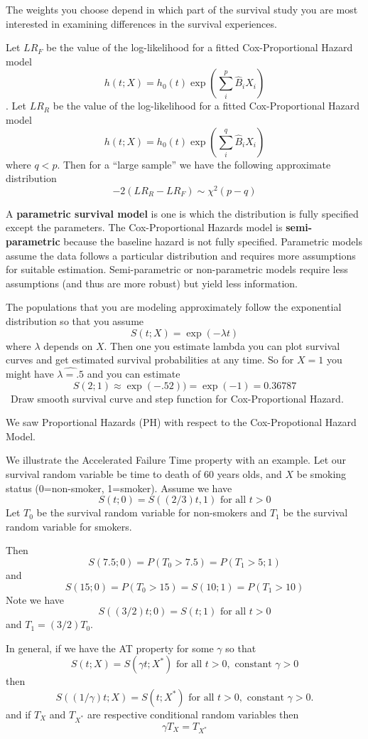 \documentclass{article}
\begin{document}
The weights you choose depend in which part of the survival study you are most interested in examining differences in the survival experiences.

  

 Let $LR_F$ be the value of the log-likelihood for a fitted Cox-Proportional Hazard model
\[ h(t;X) = h_0(t) \exp(\sum_i^p \hat{B}_iX_i) \].
Let $LR_R$ be the value of the log-likelihood for a fitted Cox-Proportional Hazard model
\[ h(t;X) = h_0(t) \exp(\sum_i^q \hat{B}_iX_i) \]
where $q<p$.
Then for a ``large sample'' we have the following approximate distribution
\[
-2(LR_R - LR_F) \sim \chi^2(p-q)
\]


A \textbf{parametric survival model} is one is which the distribution is fully specified except the parameters. The Cox-Proportional Hazards model is \textbf{semi-parametric} because the baseline hazard is not fully specified. Parametric models assume the data follows a particular distribution and requires more assumptions for suitable estimation. Semi-parametric or non-parametric models require less assumptions (and thus are more robust) but yield less information.

 The populations that you are modeling approximately follow the exponential distribution so that you assume
\[
S(t;X) = \exp(-\lambda t)
\]
where $\lambda$ depends on $X$.
Then one you estimate lambda you can plot survival curves and get estimated survival probabilities at any time.
So for $X=1$ you might have $\hat{\lambda=.5}$ and you can estimate
\[ S(2;1) \approx \exp(-.5 2)) = \exp(-1) = 0.36787
\]
\NTS \, Draw smooth survival curve and step function for Cox-Proportional Hazard.

 We saw Proportional Hazards (PH) with respect to the Cox-Propotional Hazard Model.

 We illustrate the Accelerated Failure Time property with an example. Let our survival random variable be time to death of 60 years olds, and $X$ be smoking status (0=non-smoker, 1=smoker).
Assume we have
\[
S(t;0) = S((2/3)t,1) \text{ for all } t>0
\]
Let $T_0$ be the survival random variable for non-smokers and $T_1$ be the survival random variable for smokers.

Then
\[ S(7.5;0) = P(T_0>7.5) = P(T_1>5;1) \]
 and
\[S(15;0) = P(T_0>15) = S(10;1) = P(T_1>10)
\]
Note we have
\[
S((3/2)t;0) = S(t;1) \text{ for all } t>0
\]
and $T_1=(3/2)T_0$.

 In general, if we have the AT property for some $\gamma$ so that
\[ S(t;X) =  S(\gamma t;X^*)  \text{ for all } t>0, \text{ constant } \gamma > 0
\]
then
 \[ S((1/\gamma)t;X) =  S( t;X^*)  \text{ for all } t>0, \text{ constant } \gamma > 0.
\]
and if $T_X$ and $T_{X^*}$ are respective conditional random variables then
\[
\gamma T_X = T_{X^*}
\]
\end{document}
